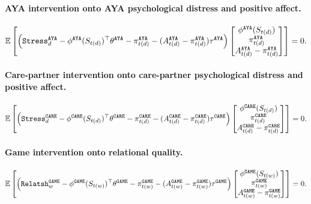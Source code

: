 \documentclass{article}
\def\AYA{{\texttt{AYA}}}
\def\EDGE{{\texttt{GAME}}}
\def\CARE{{\texttt{CARE}}}
\def\Stress{{\texttt{Stress}}}
\def\Rel{{\texttt{Relatsh}}}
\begin{document}
\paragraph{AYA intervention onto AYA psychological distress and positive affect.}

\begin{align*}
    \E\left[\left(\Stress_d^{\AYA} - \phi^{\AYA}(S_{t(d)})^{\top} \theta^{\AYA} - \pi_{t(d)}^{\AYA} - (A_{t(d)}^{\AYA} - \pi_{t(d)}^{\AYA}) \tau^{\AYA} \right) \begin{bmatrix}  \phi^{\AYA}(S_{t(d)}) \\ \pi_{t(d)}^{\AYA} \\ A_{t(d)}^{\AYA}-\pi_{t(d)}^{\AYA} \end{bmatrix} \right] = 0.
\end{align*}

\paragraph{Care-partner intervention onto care-partner psychological distress and positive affect.}

\begin{align*}
    \E\left[\left(\Stress_d^{\CARE} - \phi^{\CARE}(S_{t(d)})^{\top} \theta^{\CARE} - \pi_{t(d)}^{\CARE} - (A_{t(d)}^{\CARE} - \pi_{t(d)}^{\CARE}) \tau^{\CARE} \right) \begin{bmatrix}  \phi^{\CARE}(S_{t(d)}) \\ \pi_{t(d)}^{\CARE} \\ A_{t(d)}^{\CARE}-\pi_{t(d)}^{\CARE} \end{bmatrix} \right] = 0.
\end{align*}

\paragraph{Game intervention onto relational quality.}

\begin{align*}
    \E\left[\left(\Rel_w^{\EDGE} - \phi^{\EDGE}(S_{t(w)})^{\top} \theta^{\EDGE} - \pi_{t(w)}^{\EDGE} - (A_{t(w)}^{\EDGE} - \pi_{t(w)}^{\EDGE}) \tau^{\EDGE} \right) \begin{bmatrix}  \phi^{\EDGE}(S_{t(w)}) \\ \pi_{t(w)}^{\EDGE} \\ A_{t(w)}^{\EDGE}-\pi_{t(w)}^{\EDGE} \end{bmatrix} \right] = 0.
\end{align*}
\end{document}

